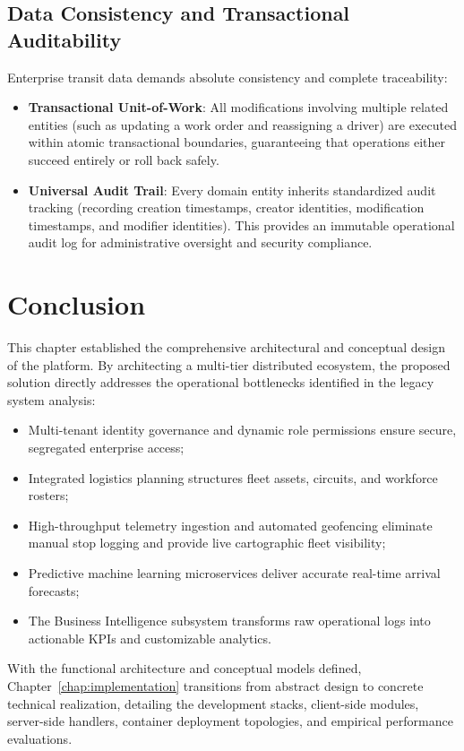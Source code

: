 \subsection{Data Consistency and Transactional Auditability}
Enterprise transit data demands absolute consistency and complete traceability:
\begin{itemize}
  \item \textbf{Transactional Unit-of-Work}: All modifications involving multiple related entities (such as updating a work order and reassigning a driver) are executed within atomic transactional boundaries, guaranteeing that operations either succeed entirely or roll back safely.
  \item \textbf{Universal Audit Trail}: Every domain entity inherits standardized audit tracking (recording creation timestamps, creator identities, modification timestamps, and modifier identities). This provides an immutable operational audit log for administrative oversight and security compliance.
\end{itemize}

\section{Conclusion}
\label{sec:solution_conclusion}

This chapter established the comprehensive architectural and conceptual design of the  platform. By architecting a multi-tier distributed ecosystem, the proposed solution directly addresses the operational bottlenecks identified in the legacy system analysis:
\begin{itemize}
  \item Multi-tenant identity governance and dynamic role permissions ensure secure, segregated enterprise access;
  \item Integrated logistics planning structures fleet assets, circuits, and workforce rosters;
  \item High-throughput telemetry ingestion and automated geofencing eliminate manual stop logging and provide live cartographic fleet visibility;
  \item Predictive machine learning microservices deliver accurate real-time arrival forecasts;
  \item The Business Intelligence subsystem transforms raw operational logs into actionable KPIs and customizable analytics.
\end{itemize}

With the functional architecture and conceptual models defined, Chapter~\ref{chap:implementation} transitions from abstract design to concrete technical realization, detailing the development stacks, client-side modules, server-side handlers, container deployment topologies, and empirical performance evaluations.
